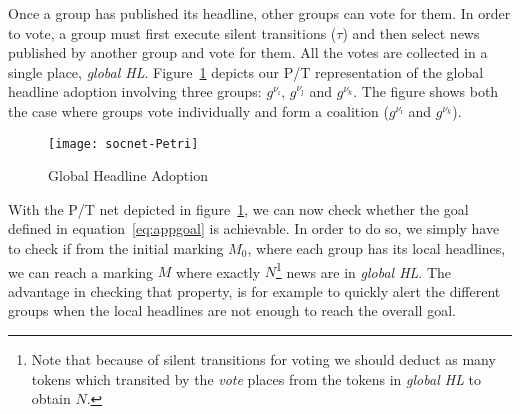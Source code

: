 Once a group has published its headline, other groups can vote for them. In order to vote, a group must first execute
silent transitions ($\tau$) and then select news published by another group and vote for them. All the votes are
collected in a single place, \emph{global HL}. Figure~\ref{fig:sn-news-Petri} depicts our P/T representation of the
global headline adoption involving three groups: $g^{\nu_\imath}$, $g^{\nu_\jmath}$ and $g^{\nu_k}$. The figure shows
both the case where groups vote individually and form a coalition ($g^{\nu_\imath}$ and $g^{\nu_k}$).

\begin{figure}
	\centering 
	\texttt{[image: socnet-Petri]} 
	\caption{Global Headline Adoption}
	\label{fig:sn-news-Petri} 
\end{figure}

With the P/T net depicted in figure~\ref{fig:sn-news-Petri}, we can now check whether the goal defined in
equation~\ref{eq:appgoal} is achievable. In order to do so, we simply have to check if from the initial marking $M_0$,
where each group has its local headlines, we can reach a marking $M$ where exactly $N$\footnote{Note that because of
silent transitions for voting we should deduct as many tokens which transited by the \emph{vote} places from the tokens
in \emph{global HL} to obtain $N$.} news are in \emph{global HL}. The advantage in checking that property, is for example
to quickly alert the different groups when the local headlines are not enough to reach the overall goal.

